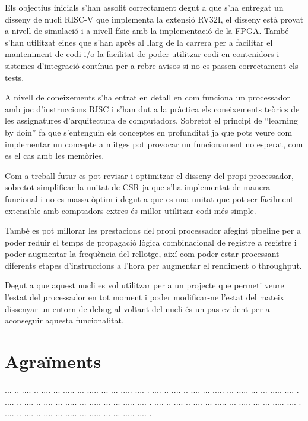 \documentclass[10pt,a4paper,twocolumn,twoside]{article}
\begin{document}
Els objectius inicials s'han assolit correctament degut a que s'ha entregat un disseny de nucli RISC-V que implementa la extensió RV32I, el disseny està provat a nivell de simulació i a nivell físic amb la implementació de la FPGA. També s'han utilitzat eines que s'han après al llarg de la carrera per a facilitar el manteniment de codi i/o la facilitat de poder utilitzar codi en contenidors i sistemes d'integració contínua per a rebre avisos si no es passen correctament els tests.

A nivell de coneixements s'ha entrat en detall en com funciona un processador amb joc d'instruccions RISC i s'han dut a la pràctica els coneixements teòrics de les assignatures d'arquitectura de computadors.
Sobretot el principi de ``learning by doin'' fa que s'entenguin els conceptes en profunditat ja que pots veure com implementar un concepte a mitges pot provocar un funcionament no esperat, com es el cas amb les memòries.

Com a treball futur es pot revisar i optimitzar el disseny del propi processador, sobretot simplificar la unitat de CSR ja que s'ha implementat de manera funcional i no es massa òptim i degut a que es una unitat que pot ser fàcilment extensible amb comptadors extres és millor utilitzar codi més simple.

També es pot millorar les prestacions del propi processador afegint pipeline per a poder reduir el temps de propagació lògica combinacional de registre a registre i poder augmentar la freqüència del rellotge, així com poder estar processant diferents etapes d'instruccions a l'hora per augmentar el rendiment o throughput.

Degut a que aquest nucli es vol utilitzar per a un projecte que permeti veure l'estat del processador en tot moment i poder modificar-ne l'estat del mateix dissenyar un entorn de debug al voltant del nucli és un pas evident per a aconseguir aquesta funcionalitat.
    
    



\section*{Agraïments}

... ..  .... .. .... ... ..... ... ..... ... ... ..... .... .
.... ..  .... .. .... ... ..... ... ..... ... ... ..... .... .
.... ..  .... .. .... ... ..... ... ..... ... ... ..... .... .
.... ..  .... .. .... ... ..... ... ..... ... ... ..... .... .
.... ..  .... .. .... ... ..... ... ..... ... ... ..... .... .
\end{document}
